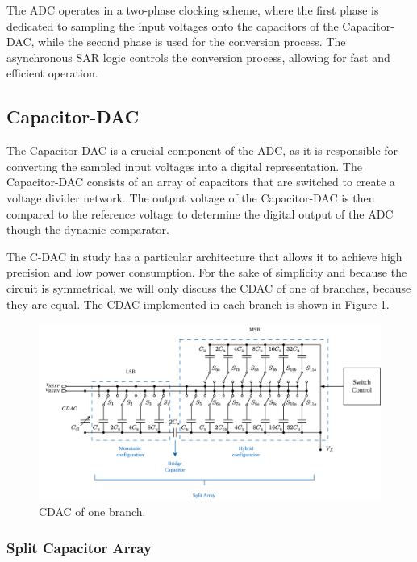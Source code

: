 The ADC operates in a two-phase clocking scheme, where the first phase is dedicated to sampling the input voltages onto the capacitors of the Capacitor-DAC, while the second phase is used for the conversion process. The asynchronous SAR logic controls the conversion process, allowing for fast and efficient operation.

\subsection{Capacitor-DAC}

The Capacitor-DAC is a crucial component of the ADC, as it is responsible for converting the sampled input voltages into a digital representation. The Capacitor-DAC consists of an array of capacitors that are switched to create a voltage divider network. The output voltage of the Capacitor-DAC is then compared to the reference voltage to determine the digital output of the ADC though the dynamic comparator.

The C-DAC in study has a particular architecture that allows it to achieve high precision and low power consumption. 
For the sake of simplicity and because the circuit is symmetrical, we will only discuss the CDAC of one of branches, because they are equal. The CDAC implemented in each branch is shown in Figure \ref{fig:CDAC-sch}. 

\begin{figure}[h]
    \centering
    \includegraphics[width=1\textwidth]{Images/CDAC-sch.png}
    \caption{CDAC of one branch.}
    \label{fig:CDAC-sch}
\end{figure}

\subsubsection{Split Capacitor Array}


